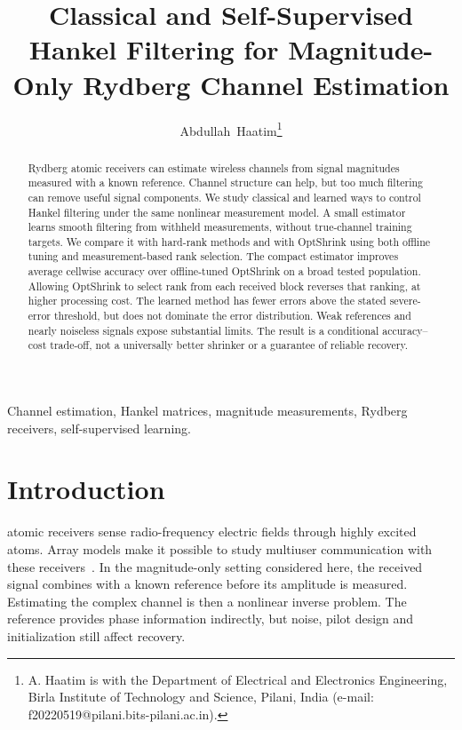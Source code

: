 \documentclass[10pt,journal,letterpaper]{IEEEtran}
\begin{document}
\title{Classical and Self-Supervised Hankel Filtering for Magnitude-Only Rydberg Channel Estimation}
\author{Abdullah~Haatim\thanks{A. Haatim is with the Department of Electrical and Electronics Engineering, Birla Institute of Technology and Science, Pilani, India (e-mail: f20220519@pilani.bits-pilani.ac.in).}}
\maketitle
\begin{abstract}
Rydberg atomic receivers can estimate wireless channels from signal magnitudes measured with a known reference. Channel structure can help, but too much filtering can remove useful signal components. We study classical and learned ways to control Hankel filtering under the same nonlinear measurement model. A small estimator learns smooth filtering from withheld measurements, without true-channel training targets. We compare it with hard-rank methods and with OptShrink using both offline tuning and measurement-based rank selection. The compact estimator improves average cellwise accuracy over offline-tuned OptShrink on a broad tested population. Allowing OptShrink to select rank from each received block reverses that ranking, at higher processing cost. The learned method has fewer errors above the stated severe-error threshold, but does not dominate the error distribution. Weak references and nearly noiseless signals expose substantial limits. The result is a conditional accuracy--cost trade-off, not a universally better shrinker or a guarantee of reliable recovery.
\end{abstract}
\begin{IEEEkeywords}
Channel estimation, Hankel matrices, magnitude measurements, Rydberg receivers, self-supervised learning.
\end{IEEEkeywords}

\section{Introduction}
 atomic receivers sense radio-frequency electric fields through highly excited atoms. Array models make it possible to study multiuser communication with these receivers~\cite{cui2025,gong2025mag}. In the magnitude-only setting considered here, the received signal combines with a known reference before its amplitude is measured. Estimating the complex channel is then a nonlinear inverse problem. The reference provides phase information indirectly, but noise, pilot design and initialization still affect recovery.
\end{document}
